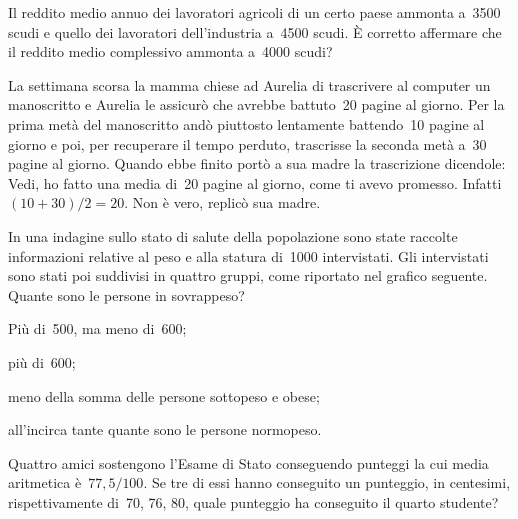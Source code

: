\begin{esercizio}
\label{ese:A.48}
Il reddito medio annuo dei lavoratori agricoli di un certo paese ammonta a~3500 scudi e quello dei lavoratori dell'industria
a~4500 scudi. È corretto affermare che il reddito medio complessivo ammonta a~4000 scudi?
\end{esercizio}

\begin{esercizio}
\label{ese:A.49}
La settimana scorsa la mamma chiese ad Aurelia di trascrivere al computer un manoscritto e Aurelia le assicurò che avrebbe
battuto~20 pagine al giorno. Per la prima metà del manoscritto andò piuttosto lentamente battendo~10 pagine al giorno e poi,
per recuperare il tempo perduto, trascrisse la seconda metà a~30 pagine al giorno.
Quando ebbe finito portò a sua madre la trascrizione dicendole: Vedi, ho fatto una media di~20 pagine al giorno,
come ti avevo promesso. Infatti~$(10+30)/2=20$. Non è vero, replicò sua madre.
\end{esercizio}

\begin{esercizio}
\label{ese:A.50}
In una indagine sullo stato di salute della popolazione sono state raccolte informazioni relative al peso e
alla statura di~1000 intervistati. Gli intervistati sono stati poi suddivisi in quattro gruppi,
come riportato nel grafico seguente. Quante sono le persone in sovrappeso?

\begin{enumeratea}
 \item Più di~500, ma meno di~600;
 \item più di~600;
 \item meno della somma delle persone sottopeso e obese;
 \item all'incirca tante quante sono le persone normopeso.
\end{enumeratea}
\begin{center}
 
\end{center}

\end{esercizio}

\begin{esercizio}
\label{ese:A.51}
Quattro amici sostengono l'Esame di Stato conseguendo punteggi la cui media aritmetica è~$77,5/100$.
Se tre di essi hanno conseguito un punteggio, in centesimi, rispettivamente di~70, 76, 80, quale punteggio ha conseguito il quarto studente?
\end{esercizio}


